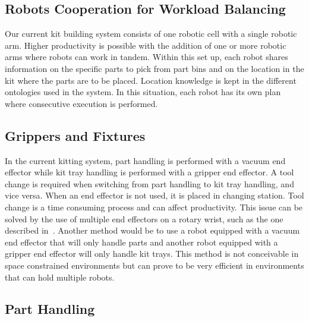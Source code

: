 \documentclass[final,12pt]{elsarticle}
\begin{document}


\subsection{Robots Cooperation for Workload Balancing}
Our current kit building system consists of one robotic cell with a single robotic arm. Higher productivity is possible with the addition of one or more robotic arms where robots can work in tandem. Within this set up, each robot shares information on the specific parts to pick from part bins and on the location in the kit where the parts are to be placed. Location knowledge is kept in the different ontologies used in the system. In this situation, each robot has its own plan where consecutive execution is performed. 

\subsection{Grippers and Fixtures}
In the current kitting system, part handling is performed with a vacuum end effector while kit tray handling is performed with a gripper end effector. A tool change is required when switching from part handling to kit tray handling, and vice versa. When an end effector is not used, it is placed in changing station. Tool change is a time consuming process and can affect productivity. This issue can be solved by the use of multiple end effectors on a rotary wrist, such as the one described in~\cite{}. 
Another method would be to use a robot equipped with a vacuum end effector that will only handle parts and another robot equipped with a gripper end effector will only handle kit trays. This method is not conceivable in space constrained environments but can prove to be very efficient in environments that can hold multiple robots.
\subsection{Part Handling}
\end{document}
